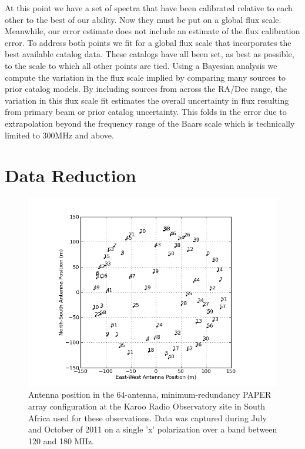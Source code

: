 \documentclass[preprint]{aastex}
\begin{document}
At this point we have a set of spectra that have been calibrated relative to each other to the best of our ability. Now 
they must be put on a global flux scale. Meanwhile, our error estimate does not include an estimate of the 
flux calibration error.  To address both points we fit for a global flux scale that incorporates the best available
catalog data. These catalogs
have all been set, as best as possible, to the \citet{Baars:1977p9678} scale to which all other points are tied. Using a Bayesian analysis we compute the 
variation in the flux scale implied by comparing many sources to prior catalog models. By including sources from across
the RA/Dec range, the variation in this flux scale fit estimates the overall uncertainty in flux resulting from primary beam 
or prior catalog uncertainty.  This folds in the error due to extrapolation beyond the frequency range of the Baars scale which is
technically limited to 300MHz and above.

 \section{Data Reduction}
 \label{sec:Observations}


\begin{figure}\centering
\includegraphics[width=0.85\columnwidth]{plots/antpos.png}
\caption{Antenna position in the 64-antenna, minimum-redundancy PAPER array configuration at the Karoo Radio Observatory site in South Africa used for these observations.
Data was captured during July and October of 2011 on a single 'x' polarization over a band between 120 and 180 MHz.
}\label{fig:antpos}
\end{figure}
\end{document}

